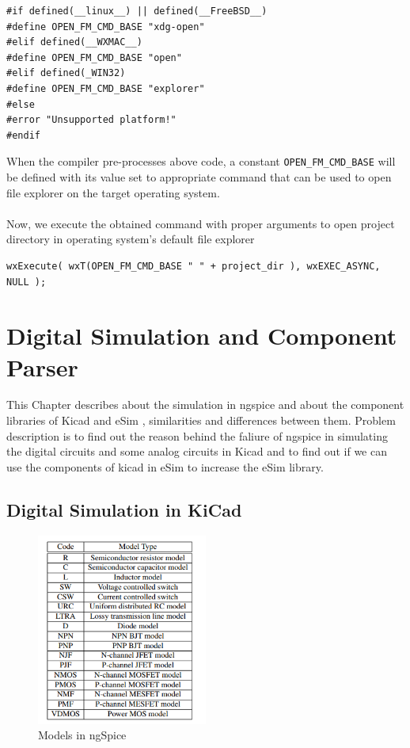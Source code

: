 \documentclass[12pt,a4paper]{report}
\begin{document}
\begin{verbatim}
#if defined(__linux__) || defined(__FreeBSD__)
#define OPEN_FM_CMD_BASE "xdg-open"
#elif defined(__WXMAC__)
#define OPEN_FM_CMD_BASE "open"
#elif defined(_WIN32)
#define OPEN_FM_CMD_BASE "explorer"
#else
#error "Unsupported platform!"
#endif
\end{verbatim}

When the compiler pre-processes above code, a constant \texttt{OPEN\_FM\_CMD\_BASE} will be defined with its value set to appropriate command that can be used to open file explorer on the target operating system.\\
\\
Now, we execute the obtained command with proper arguments to open project directory in operating system's default file explorer
\begin{verbatim}
wxExecute( wxT(OPEN_FM_CMD_BASE " " + project_dir ), wxEXEC_ASYNC, NULL );
\end{verbatim}

\chapter{\textbf{Digital Simulation and Component Parser}}
This Chapter describes about the simulation in ngspice and about the component libraries of Kicad and eSim , similarities and differences between them. Problem description is to find out the reason behind the faliure of ngspice in simulating the digital circuits and some analog circuits in Kicad and to find out if we can use the components of kicad in eSim to increase the eSim library.
\section{Digital Simulation in KiCad}

\begin{figure} %
	\centering
	\includegraphics[width=0.5\textwidth]{models}
	\caption{Models in ngSpice}
\end{figure}
\end{document}
